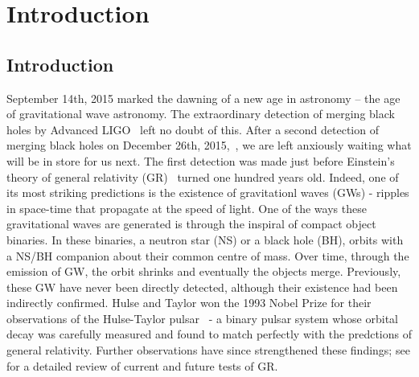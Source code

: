 \chapter{Introduction}
\label{chap:intro}


\section{Introduction}

September 14th, 2015 marked the dawning of a new age in astronomy -- the age of gravitational wave astronomy. The extraordinary detection of merging black holes by Advanced LIGO~\citep{LIGOVirgo2016a} left no doubt of this. After a second detection of merging black holes on December 26th, 2015,~\cite{Abbott:2016nmj}, we are left anxiously waiting what will be in store for us next. The first detection was made just before Einstein's theory of general relativity (GR)~\citep{Einstein:1915by} turned one hundred years old. Indeed, one of its most striking predictions is the existence of gravitationl waves (GWs) - ripples in space-time that propagate at the speed of light. One of the ways these gravitational waves are generated is through the inspiral of compact object binaries. In these binaries, a neutron star (NS) or a black hole (BH), orbits with a NS/BH companion about their common centre of mass. Over time, through the emission of GW, the orbit shrinks and eventually the objects merge. Previously, these GW have never been directly detected, although their existence had been indirectly confirmed. Hulse and Taylor won the 1993 Nobel Prize for their observations of the Hulse-Taylor pulsar~\citep{Hulse:1974eb} - a binary pulsar system whose orbital decay was carefully measured and found to match perfectly with the predctions of general relativity. Further observations have since strengthened these findings; see \cite{Berti:2015itd} for a detailed review of current and future tests of GR. 

